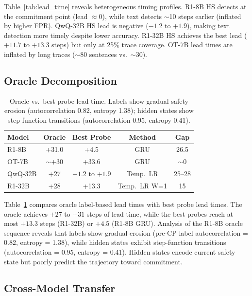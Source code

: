 \documentclass[11pt]{article}
\begin{document}
Table~\ref{tab:lead_time} reveals heterogeneous timing profiles.
R1-8B HS detects at the commitment point (lead $\approx 0$), while text detects $\sim$10 steps earlier (inflated by higher FPR).
QwQ-32B HS lead is negative ($-1.2$ to $+1.9$), making text detection more timely despite lower accuracy.
R1-32B HS achieves the best lead ($+11.7$ to $+13.3$ steps) but only at 25\% trace coverage.
OT-7B lead times are inflated by long traces ($\sim$80 sentences vs.\ $\sim$30).

\subsection{Oracle Decomposition}
\label{sec:oracle}

\begin{table}[t]
\centering
\small
\begin{tabular}{@{}lcccc@{}}
\toprule
\textbf{Model} & \textbf{Oracle} & \textbf{Best Probe} & \textbf{Method} & \textbf{Gap} \\
\midrule
R1-8B & +31.0 & +4.5 & GRU & 26.5 \\
OT-7B & $\sim$+30 & +33.6 & GRU & $\sim$0 \\
QwQ-32B & +27 & $-1.2$ to $+1.9$ & Temp.\ LR & 25--28 \\
R1-32B & +28 & +13.3 & Temp.\ LR W=1 & 15 \\
\bottomrule
\end{tabular}
\caption{Oracle vs.\ best probe lead time. Labels show gradual safety erosion (autocorrelation 0.82, entropy 1.38); hidden states show step-function transitions (autocorrelation 0.95, entropy 0.41).}
\label{tab:oracle}
\end{table}

Table~\ref{tab:oracle} compares oracle label-based lead times with best probe lead times.
The oracle achieves $+27$ to $+31$ steps of lead time, while the best probes reach at most $+13.3$ steps (R1-32B) or $+4.5$ (R1-8B GRU).
Analysis of the R1-8B oracle sequence reveals that labels show gradual erosion (pre-CP label autocorrelation = 0.82, entropy = 1.38), while hidden states exhibit step-function transitions (autocorrelation = 0.95, entropy = 0.41).
Hidden states encode current safety state but poorly predict the trajectory toward commitment.

\subsection{Cross-Model Transfer}
\label{sec:transfer}
\end{document}

